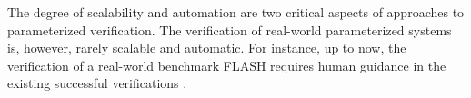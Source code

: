\documentclass[conference]{IEEEtran}
\begin{document}
The degree of scalability and automation are two critical aspects of approaches to parameterized verification.
The verification of real-world parameterized systems is, however,  rarely  scalable and automatic.
For instance, up to now, the verification of a real-world benchmark FLASH requires human guidance in the existing successful verifications \cite{Park1996a,McMillan2001,Chou2004}. %
\end{document}
